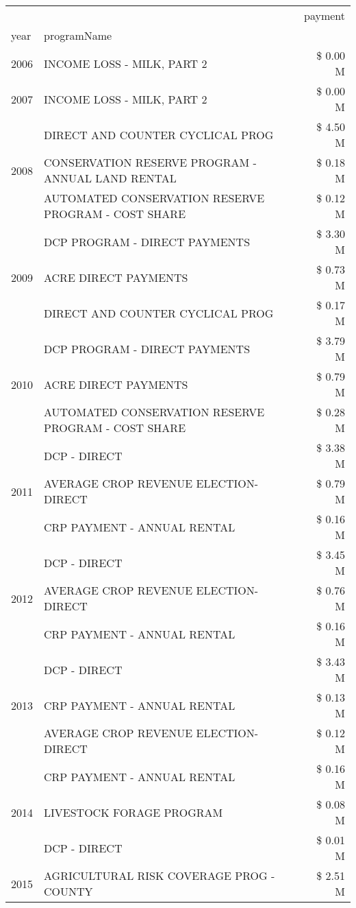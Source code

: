\begin{tabular}{llr}
\toprule
 &  & payment \\
year & programName &  \\
\midrule
2006 & INCOME LOSS - MILK, PART 2 & \$ 0.00 M \\
\cline{1-3}
2007 & INCOME LOSS - MILK, PART 2 & \$ 0.00 M \\
\cline{1-3}
\multirow[t]{3}{*}{2008} & DIRECT AND COUNTER CYCLICAL PROG & \$ 4.50 M \\
 & CONSERVATION RESERVE PROGRAM - ANNUAL LAND RENTAL & \$ 0.18 M \\
 & AUTOMATED CONSERVATION RESERVE PROGRAM - COST SHARE & \$ 0.12 M \\
\cline{1-3}
\multirow[t]{3}{*}{2009} & DCP PROGRAM - DIRECT PAYMENTS & \$ 3.30 M \\
 & ACRE DIRECT PAYMENTS & \$ 0.73 M \\
 & DIRECT AND COUNTER CYCLICAL PROG & \$ 0.17 M \\
\cline{1-3}
\multirow[t]{3}{*}{2010} & DCP PROGRAM - DIRECT PAYMENTS & \$ 3.79 M \\
 & ACRE DIRECT PAYMENTS & \$ 0.79 M \\
 & AUTOMATED CONSERVATION RESERVE PROGRAM - COST SHARE & \$ 0.28 M \\
\cline{1-3}
\multirow[t]{3}{*}{2011} & DCP - DIRECT & \$ 3.38 M \\
 & AVERAGE CROP REVENUE ELECTION-DIRECT & \$ 0.79 M \\
 & CRP PAYMENT - ANNUAL RENTAL & \$ 0.16 M \\
\cline{1-3}
\multirow[t]{3}{*}{2012} & DCP - DIRECT & \$ 3.45 M \\
 & AVERAGE CROP REVENUE ELECTION-DIRECT & \$ 0.76 M \\
 & CRP PAYMENT - ANNUAL RENTAL & \$ 0.16 M \\
\cline{1-3}
\multirow[t]{3}{*}{2013} & DCP - DIRECT & \$ 3.43 M \\
 & CRP PAYMENT - ANNUAL RENTAL & \$ 0.13 M \\
 & AVERAGE CROP REVENUE ELECTION-DIRECT & \$ 0.12 M \\
\cline{1-3}
\multirow[t]{3}{*}{2014} & CRP PAYMENT - ANNUAL RENTAL & \$ 0.16 M \\
 & LIVESTOCK FORAGE PROGRAM & \$ 0.08 M \\
 & DCP - DIRECT & \$ 0.01 M \\
\cline{1-3}
\multirow[t]{3}{*}{2015} & AGRICULTURAL RISK COVERAGE PROG - COUNTY & \$ 2.51 M \\

\end{tabular}
